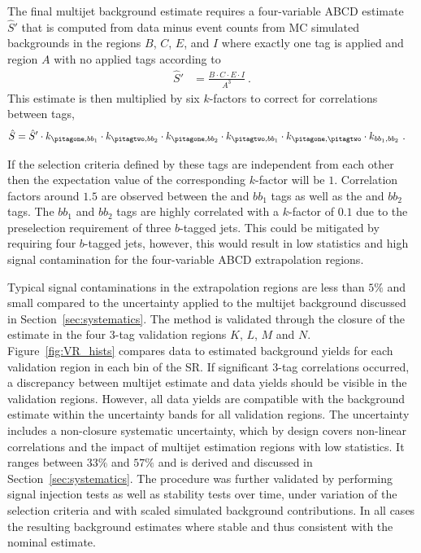 The final multijet background estimate requires a four-variable ABCD estimate $\hat{S}'$ that is computed from data minus event counts from MC simulated backgrounds in the regions $B$, $C$, $E$, and $I$ where exactly one tag is applied and region $A$ with no applied tags according to
\begin{align}
  \hat{S}' &= \frac{B\cdot C\cdot E\cdot I}{A^3}~.
  \label{eq:ABCD_Sprime}
\end{align}
This estimate is then multiplied by six $k$-factors to correct for correlations between tags,
\begin{align}
  \label{eq:ABCD_S}
  \hat{S} &= \hat{S}' \cdot k_{\pitagone,bb_1} \cdot k_{\pitagtwo,bb_2} \cdot k_{\pitagone,bb_2} \cdot k_{\pitagtwo,bb_1} \cdot k_{\pitagone,\pitagtwo} \cdot k_{bb_1,bb_2}~.
\end{align}

If the selection criteria defined by these tags are independent from each other then the expectation value of the corresponding $k$-factor will be $1$. Correlation factors around $1.5$ are observed between the \pitagone and $bb_1$ tags as well as the \pitagtwo and $bb_2$ tags. The $bb_1$ and $bb_2$ tags are highly correlated with a $k$-factor of $0.1$ due to the preselection requirement of three $b$-tagged jets. This could be mitigated by requiring four $b$-tagged jets, however, this would result in low statistics and high signal contamination for the four-variable ABCD extrapolation regions.

Typical signal contaminations in the extrapolation regions are less than $5\%$ and small compared to the uncertainty applied to the multijet background discussed in Section~\ref{sec:systematics}. The method is validated through the closure of the estimate in the four 3-tag validation regions $K$, $L$, $M$ and $N$. Figure~\ref{fig:VR_hists} compares data to estimated background yields for each validation region in each bin of the SR. If significant 3-tag correlations occurred, a discrepancy between multijet estimate and data yields should be visible in the validation regions. However, all data yields are compatible with the background estimate within the uncertainty bands for all validation regions. The uncertainty includes a non-closure systematic uncertainty, which by design covers non-linear correlations and the impact of multijet estimation regions with low statistics. It ranges between $33\%$ and $57\%$ and is derived and discussed in Section~\ref{sec:systematics}. The procedure was further validated by performing signal injection tests as well as stability tests over time, under variation of the selection criteria and with scaled simulated background contributions. In all cases the resulting background estimates where stable and thus consistent with the nominal estimate.

